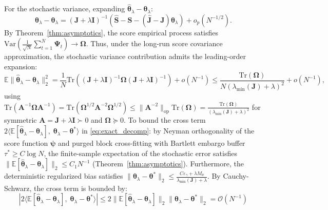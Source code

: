 \documentclass[twoside]{article}
\theoremstyle{definition}
\newcommand{\E}{\mathbb{E}}
\newcommand{\Var}{\mathrm{Var}}
\begin{document}
For the stochastic variance, expanding $\hat{\boldsymbol{\theta}}_\lambda - \boldsymbol{\theta}_\lambda$:
\begin{equation}
    \hat{\boldsymbol{\theta}}_\lambda - \boldsymbol{\theta}_\lambda = (\boldsymbol{J} + \lambda \boldsymbol{I})^{-1} \left( \hat{\boldsymbol{S}} - \boldsymbol{S} - (\hat{\boldsymbol{J}} - \boldsymbol{J})\boldsymbol{\theta}_\lambda \right) + o_p(N^{-1/2}).
\end{equation}
By Theorem~\ref{thm:asymptotics}, the score empirical process satisfies $\Var\left( \frac{1}{\sqrt{N}}\sum_{t=1}^N \boldsymbol{\Psi}_t \right) \to \boldsymbol{\Omega}$. Thus, under the long-run score covariance approximation, the stochastic variance contribution admits the leading-order expansion:
\begin{equation}
    \E\|\hat{\boldsymbol{\theta}}_\lambda - \boldsymbol{\theta}_\lambda\|_2^2 = \frac{1}{N} \mathrm{Tr}\left( (\boldsymbol{J} + \lambda \boldsymbol{I})^{-1} \boldsymbol{\Omega} (\boldsymbol{J} + \lambda \boldsymbol{I})^{-1} \right) + o(N^{-1}) \le \frac{\mathrm{Tr}(\boldsymbol{\Omega})}{N (\lambda_{\min}(\boldsymbol{J}) + \lambda)^2} + o(N^{-1}),
\end{equation}
using $\mathrm{Tr}(\boldsymbol{A}^{-1}\boldsymbol{\Omega}\boldsymbol{A}^{-1}) = \mathrm{Tr}(\boldsymbol{\Omega}^{1/2}\boldsymbol{A}^{-2}\boldsymbol{\Omega}^{1/2}) \le \|\boldsymbol{A}^{-2}\|_{\mathrm{op}}\mathrm{Tr}(\boldsymbol{\Omega}) = \frac{\mathrm{Tr}(\boldsymbol{\Omega})}{(\lambda_{\min}(\boldsymbol{J})+\lambda)^2}$ for symmetric $\boldsymbol{A} = \boldsymbol{J}+\lambda\boldsymbol{I} \succ 0$ and $\boldsymbol{\Omega} \succeq 0$.
To bound the cross term $2 \langle \E[\hat{\boldsymbol{\theta}}_\lambda - \boldsymbol{\theta}_\lambda], \; \boldsymbol{\theta}_\lambda - \boldsymbol{\theta}^* \rangle$ in \eqref{eq:exact_decomp}: by Neyman orthogonality of the score function $\boldsymbol{\psi}$ and purged block cross-fitting with Bartlett embargo buffer $\tau^* \ge C \log N$, the finite-sample expectation of the stochastic error satisfies $\|\E[\hat{\boldsymbol{\theta}}_\lambda - \boldsymbol{\theta}_\lambda]\|_2 \le C_1 N^{-1}$ (Theorem~\ref{thm:asymptotics}). Furthermore, the deterministic regularized bias satisfies $\|\boldsymbol{\theta}_\lambda - \boldsymbol{\theta}^*\|_2 \le \frac{C \varepsilon_\gamma + \lambda M_\theta}{\lambda_{\min}(\boldsymbol{J}) + \lambda}$. By Cauchy-Schwarz, the cross term is bounded by:
\begin{equation}
    \left| 2 \langle \E[\hat{\boldsymbol{\theta}}_\lambda - \boldsymbol{\theta}_\lambda], \; \boldsymbol{\theta}_\lambda - \boldsymbol{\theta}^* \rangle \right| \le 2 \|\E[\hat{\boldsymbol{\theta}}_\lambda - \boldsymbol{\theta}_\lambda]\|_2 \|\boldsymbol{\theta}_\lambda - \boldsymbol{\theta}^*\|_2 = \mathcal{O}(N^{-1})
\end{equation}
\end{document}
